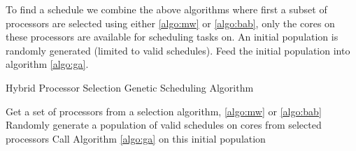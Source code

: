 \documentclass[conference]{IEEEtran}
\begin{document}
To find a schedule we combine the above algorithms where first a subset of processors are selected using either \ref{algo:mw} or \ref{algo:bab}, only the cores on these processors are available for scheduling tasks on. An initial population is randomly generated (limited to valid schedules). Feed the initial population into algorithm \ref{algo:ga}.

\begin{algorithm}
\caption{Hybrid Processor Selection Genetic Scheduling Algorithm} \label{algo:hypsgsa}
\footnotesize
\begin{algorithmic}[1]
\STATE Get a set of processors from a selection algorithm, \ref{algo:mw} or \ref{algo:bab}
\STATE Randomly generate a population of valid schedules on cores from selected processors
\STATE Call Algorithm \ref{algo:ga} on this initial population
\end{algorithmic}
\end{algorithm}
\vspace{-0.2in}






%
\end{document}
